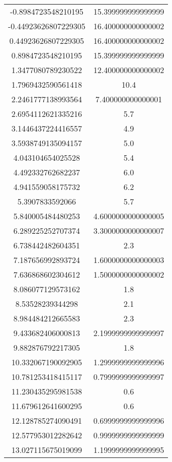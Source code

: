 \begin{table}
\begin{tabular}{S[]S[]}
-0.8984723548210195 & 15.399999999999999\\
-0.44923626807229305 & 16.400000000000002\\
0.44923626807229305 & 16.400000000000002\\
0.8984723548210195 & 15.399999999999999\\
1.3477080789230522 & 12.400000000000002\\
1.7969432590561418 & 10.4\\
2.2461777138993564 & 7.400000000000001\\
2.6954112621335216 & 5.7\\
3.1446437224416557 & 4.9\\
3.5938749135094157 & 5.0\\
4.043104654025528 & 5.4\\
4.492332762682237 & 6.0\\
4.941559058175732 & 6.2\\
5.3907833592066 & 5.7\\
5.840005484480253 & 4.6000000000000005\\
6.289225252707374 & 3.3000000000000007\\
6.738442482604351 & 2.3\\
7.187656992893724 & 1.6000000000000003\\
7.636868602304612 & 1.5000000000000002\\
8.086077129573162 & 1.8\\
8.53528239344298 & 2.1\\
8.984484212665583 & 2.3\\
9.433682406000813 & 2.1999999999999997\\
9.882876792217305 & 1.8\\
10.332067190092905 & 1.2999999999999996\\
10.781253418415117 & 0.7999999999999997\\
11.230435295981538 & 0.6\\
11.679612641600295 & 0.6\\
12.128785274090491 & 0.6999999999999996\\
12.577953012282642 & 0.9999999999999999\\
13.027115675019099 & 1.1999999999999995\\
\bottomrule
\end{tabular}\end{table}